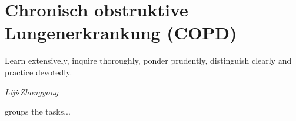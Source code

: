\ifpdf
    \graphicspath{{2_chronisch_obstruktive_lungenerkrankung/figures/PNG/}{2_chronisch_obstruktive_lungenerkrankung/figures/PDF/}{2_chronisch_obstruktive_lungenerkrankung/figures/}}
\else
    \graphicspath{{2_chronisch_obstruktive_lungenerkrankung/figures/EPS/}{2_chronisch_obstruktive_lungenerkrankung/figures/}}
\fi

\chapter{Chronisch obstruktive Lungenerkrankung (COPD)}
\label{chapter:soa}
\setlength{\epigraphwidth}{6.0cm}
\epigraph{Learn extensively, inquire thoroughly, ponder prudently, distinguish clearly and practice devotedly.}{\emph{Liji$\cdot$Zhongyong}}



\citet{fairfield2009phd} groups the tasks...
\newpage\thispagestyle{empty}